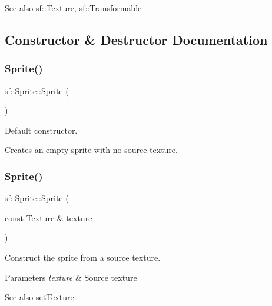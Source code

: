 \begin{DoxySeeAlso}{See also}
\hyperlink{classsf_1_1_texture}{sf\+::\+Texture}, \hyperlink{classsf_1_1_transformable}{sf\+::\+Transformable} 
\end{DoxySeeAlso}


\subsection{Constructor \& Destructor Documentation}
\mbox{\label{classsf_1_1_sprite_a92559fbca895a96758abf5eabab96984}} 
\subsubsection{\texorpdfstring{Sprite()}{Sprite()}\hspace{0.1cm}{\footnotesize\ttfamily [1/3]}}
{\footnotesize\ttfamily sf\+::\+Sprite\+::\+Sprite (\begin{DoxyParamCaption}{ }\end{DoxyParamCaption})}



Default constructor. 

Creates an empty sprite with no source texture. \mbox{\label{classsf_1_1_sprite_a2a9fca374d7abf084bb1c143a879ff4a}} 
\subsubsection{\texorpdfstring{Sprite()}{Sprite()}\hspace{0.1cm}{\footnotesize\ttfamily [2/3]}}
{\footnotesize\ttfamily sf\+::\+Sprite\+::\+Sprite (\begin{DoxyParamCaption}\item[{const \hyperlink{classsf_1_1_texture}{Texture} \&}]{texture }\end{DoxyParamCaption})\hspace{0.3cm}{\ttfamily [explicit]}}



Construct the sprite from a source texture. 


\begin{DoxyParams}{Parameters}
{\em texture} & Source texture\\
\hline
\end{DoxyParams}
\begin{DoxySeeAlso}{See also}
\hyperlink{classsf_1_1_sprite_a3729c88d88ac38c19317c18e87242560}{set\+Texture} 
\end{DoxySeeAlso}
\mbox{\label{classsf_1_1_sprite_a01cfe1402372d243dbaa2ffa96020206}} 
